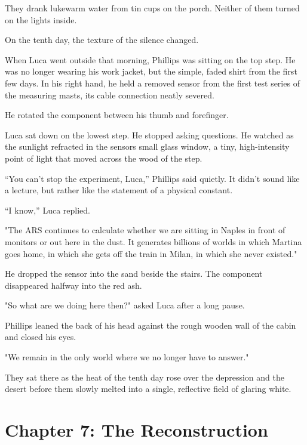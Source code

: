 \documentclass[
  ngerman,
]{article}
\begin{document}
They drank lukewarm water from tin cups on the porch. Neither of them
turned on the lights inside.

On the tenth day, the texture of the silence changed.

When Luca went outside that morning, Phillips was sitting on the top
step. He was no longer wearing his work jacket, but the simple, faded
shirt from the first few days. In his right hand, he held a removed
sensor from the first test series of the measuring masts, its cable
connection neatly severed.

He rotated the component between his thumb and forefinger.

Luca sat down on the lowest step. He stopped asking questions. He
watched as the sunlight refracted in the sensor\textquotesingle s small
glass window, a tiny, high-intensity point of light that moved across
the wood of the step.

``You can't stop the experiment, Luca,'' Phillips said quietly. It
didn't sound like a lecture, but rather like the statement of a physical
constant.

``I know,'' Luca replied.

"The ARS continues to calculate whether we are sitting in Naples in
front of monitors or out here in the dust. It generates billions of
worlds in which Martina goes home, in which she gets off the train in
Milan, in which she never existed."

He dropped the sensor into the sand beside the stairs. The component
disappeared halfway into the red ash.

"So what are we doing here then?" asked Luca after a long pause.

Phillips leaned the back of his head against the rough wooden wall of
the cabin and closed his eyes.

"We remain in the only world where we no longer have to answer."

They sat there as the heat of the tenth day rose over the depression and
the desert before them slowly melted into a single, reflective field of
glaring white.

\section{}\label{section-2}

\section{\texorpdfstring{\textbf{Chapter 7: The
Reconstruction}}{Chapter 7: The Reconstruction}}\label{chapter-7-the-reconstruction}
\end{document}
